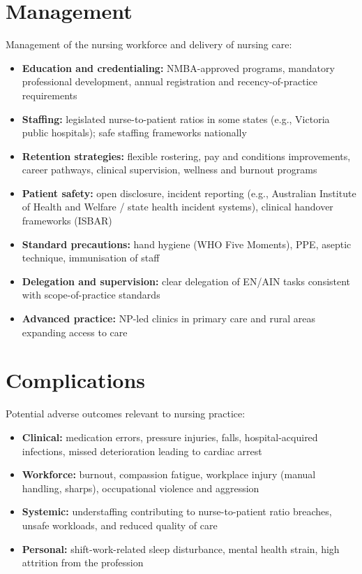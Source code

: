 \section*{Management}
Management of the nursing workforce and delivery of nursing care:
\begin{itemize}
    \item \textbf{Education and credentialing:} NMBA-approved programs, mandatory professional development, annual registration and recency-of-practice requirements
    \item \textbf{Staffing:} legislated nurse-to-patient ratios in some states (e.g., Victoria public hospitals); safe staffing frameworks nationally
    \item \textbf{Retention strategies:} flexible rostering, pay and conditions improvements, career pathways, clinical supervision, wellness and burnout programs
    \item \textbf{Patient safety:} open disclosure, incident reporting (e.g., Australian Institute of Health and Welfare / state health incident systems), clinical handover frameworks (ISBAR)
    \item \textbf{Standard precautions:} hand hygiene (WHO Five Moments), PPE, aseptic technique, immunisation of staff
    \item \textbf{Delegation and supervision:} clear delegation of EN/AIN tasks consistent with scope-of-practice standards
    \item \textbf{Advanced practice:} NP-led clinics in primary care and rural areas expanding access to care
\end{itemize}

\section*{Complications}
Potential adverse outcomes relevant to nursing practice:
\begin{itemize}
    \item \textbf{Clinical:} medication errors, pressure injuries, falls, hospital-acquired infections, missed deterioration leading to cardiac arrest
    \item \textbf{Workforce:} burnout, compassion fatigue, workplace injury (manual handling, sharps), occupational violence and aggression
    \item \textbf{Systemic:} understaffing contributing to nurse-to-patient ratio breaches, unsafe workloads, and reduced quality of care
    \item \textbf{Personal:} shift-work-related sleep disturbance, mental health strain, high attrition from the profession
\end{itemize}

